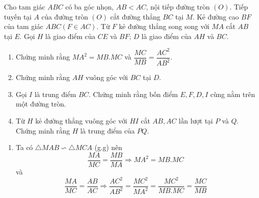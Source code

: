 \begin{ex}%
    Cho tam giác $ABC$ có ba góc nhọn, $AB<AC$, nội tiếp đường tròn $(O)$. Tiếp tuyến tại $A$ của đường tròn $(O)$ cắt đường thẳng $BC$ tại $M$. Kẻ đường cao $BF$ của tam giác $ABC (F\in AC).$ Từ $F$ kẻ đường thẳng song song với $MA$ cắt $AB$ tại $E$. Gọi $H$ là giao điểm của $CE$ và $BF$; $D$ là giao điểm của $AH$ và $BC$.
    \begin{enumerate}
        \item Chứng minh rằng $MA^2=MB.MC$ và $\dfrac{MC}{MB}=\dfrac{AC^2}{AB^2}$.
        \item Chứng minh rằng $AH$ vuông góc với $BC$ tại $D$.
        \item Gọi $I$ là trung điểm $BC$. Chứng minh rằng bốn điểm $E,F,D,I$ cùng nằm trên một đường tròn.
        \item Từ $H$ kẻ đường thẳng vuông góc với $HI$ cắt $AB,AC$ lần lượt tại $P$ và $Q$. Chứng minh rằng $H$ là trung điểm của $PQ$.
    \end{enumerate}
\loigiai
    {  
    \begin{enumerate}
    \item Ta có $\triangle MAB \backsim \triangle MCA$ (g.g) nên 
    $$\dfrac{MA}{MC}=\dfrac{MB}{MA}\Rightarrow MA^2=MB.MC$$
    và  
    $$\dfrac{MA}{MC}=\dfrac{AB}{AC}\Rightarrow \dfrac{AC^2}{AB^2}=\dfrac{MC^2}{MA^2}=\dfrac{MC^2}{MB.MC}=\dfrac{MC}{MB}$$
     \begin{center}
\end{center}
\end{enumerate}}
\end{ex}
